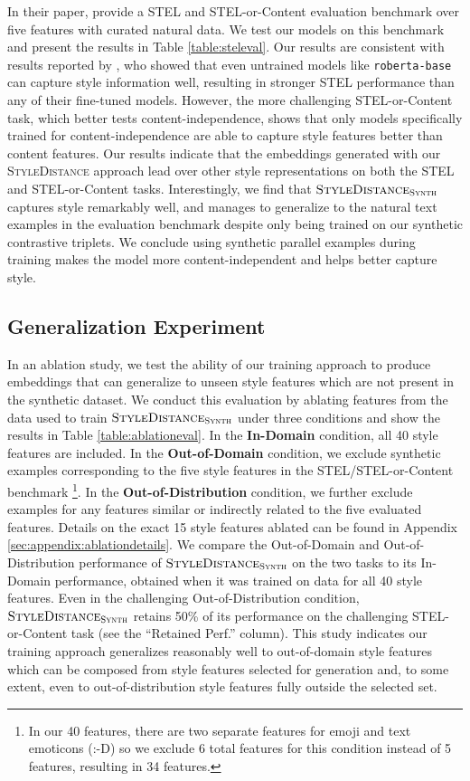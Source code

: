 In their paper, \citet{stel} provide a STEL and STEL-or-Content evaluation benchmark over five features with curated natural data. We test our models on this benchmark and present the results in Table \ref{table:steleval}. Our results are consistent with results reported by \citet{stel}, who showed that even untrained models like \texttt{roberta-base} can capture style information well, resulting in stronger STEL performance than any of their fine-tuned models. However, the more challenging STEL-or-Content task, which better tests content-independence, shows that only models specifically trained for content-independence are able to capture style features better than content features. Our results indicate that the embeddings generated with our \textsc{StyleDistance} approach lead  over other style representations on both the STEL and STEL-or-Content tasks. Interestingly, we find that $\textsc{StyleDistance}_{\textsc{Synth}}$ captures style remarkably well, and manages to generalize to the natural text examples in the evaluation benchmark despite only being trained on our synthetic contrastive triplets. We conclude using synthetic parallel examples during training makes the model more content-independent and helps better capture style. 

\subsection{Generalization Experiment} 

In an ablation study, we test the ability of our training approach to produce embeddings that can generalize to unseen style features which are not present in the synthetic dataset. We conduct this evaluation by ablating features from the data used to train $\textsc{StyleDistance}_{\textsc{Synth}}$ under three conditions and show the results in Table \ref{table:ablationeval}. In the \textbf{In-Domain} condition, all 40 style features are included. In the \textbf{Out-of-Domain} condition, we exclude synthetic examples corresponding to the five style features in the STEL/STEL-or-Content benchmark \footnote{In our 40 features, there are two separate features for emoji and text emoticons (:-D) so we exclude 6 total features for this condition instead of 5 features, resulting in 34 features.}. In the \textbf{Out-of-Distribution} condition, we further exclude examples for any features similar or indirectly related to the five evaluated features. Details on the exact 15 style features ablated can be found in Appendix \ref{sec:appendix:ablationdetails}. We compare the Out-of-Domain and Out-of-Distribution performance of $\textsc{StyleDistance}_{\textsc{Synth}}$ on the two tasks to its In-Domain performance, obtained when it was trained on data for all 40 style features. Even in the challenging Out-of-Distribution condition, $\textsc{StyleDistance}_{\textsc{Synth}}$ retains 50\% of its performance on the challenging STEL-or-Content task (see the ``Retained Perf.'' column). This study indicates our training approach generalizes reasonably well to out-of-domain style features which can be composed from style features selected for generation and, to some extent, even to out-of-distribution style features fully outside the selected set.

